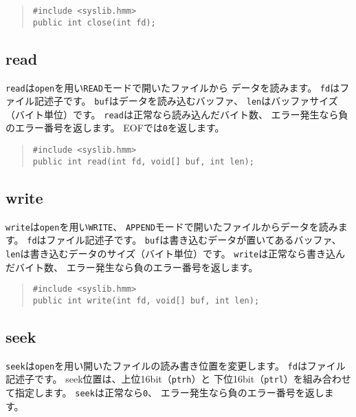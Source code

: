 \begin{quote}
\begin{verbatim}
#include <syslib.hmm>
public int close(int fd);
\end{verbatim}
\end{quote}

\subsection{read}

\verb/read/は\verb/open/を用い\verb/READ/モードで開いたファイルから
データを読みます。
\verb/fd/はファイル記述子です。
\verb/buf/はデータを読み込むバッファ、
\verb/len/はバッファサイズ（バイト単位）です。
\verb/read/は正常なら読み込んだバイト数、
エラー発生なら負のエラー番号を返します。
EOFでは\verb/0/を返します。

\begin{quote}
\begin{verbatim}
#include <syslib.hmm>
public int read(int fd, void[] buf, int len);
\end{verbatim}
\end{quote}

\subsection{write}

\verb/write/は\verb/open/を用い\verb/WRITE/、
\verb/APPEND/モードで開いたファイルからデータを読みます。
\verb/fd/はファイル記述子です。
\verb/buf/は書き込むデータが置いてあるバッファ、
\verb/len/は書き込むデータのサイズ（バイト単位）です。
\verb/write/は正常なら書き込んだバイト数、
エラー発生なら負のエラー番号を返します。

\begin{quote}
\begin{verbatim}
#include <syslib.hmm>
public int write(int fd, void[] buf, int len);
\end{verbatim}
\end{quote}

\subsection{seek}

\verb/seek/は\verb/open/を用い開いたファイルの読み書き位置を変更します。
\verb/fd/はファイル記述子です。
seek位置は、上位16bit（\verb/ptrh/）と
下位16bit（\verb/ptrl/）を組み合わせて指定します。
\verb/seek/は正常なら\verb/0/、
エラー発生なら負のエラー番号を返します。

